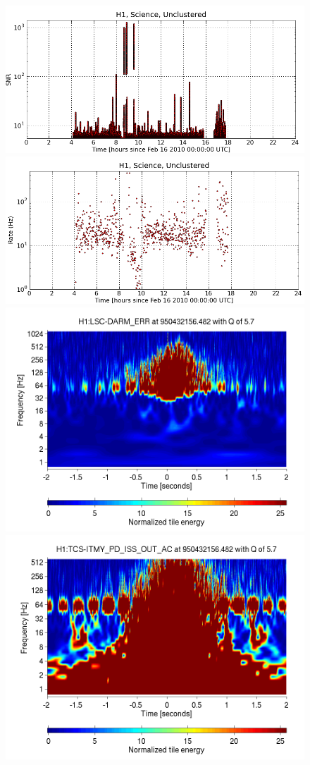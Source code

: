 %
% 

\begin{figure}
  \includegraphics[width=0.5\linewidth]{figures/detchar/20100217_H1_0_UNCLUSTERED_snr_vs_time} 
  \includegraphics[width=0.5\linewidth]{figures/detchar/20100217_H1_0_UNCLUSTERED_rate_vs_time} \\
  \includegraphics[width=0.5\linewidth]{figures/detchar/950432156_482177734_H1_LSC-DARM_ERR_4_00_spectrogram_whitened}
  \includegraphics[width=0.5\linewidth]{figures/detchar/950432156_482177734_H1_TCS-ITMY_PD_ISS_OUT_AC_4_00_spectrogram_whitened}

\end{figure}
